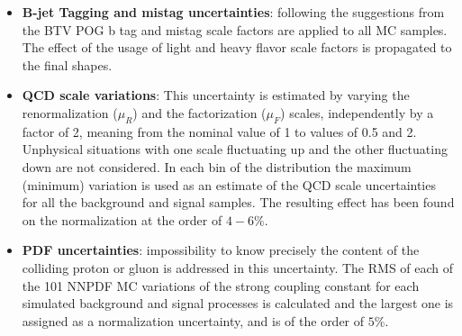 \begin{itemize}
 \item {\bf B-jet Tagging and mistag uncertainties}: following the suggestions from the BTV POG
   b tag and mistag scale factors are applied to all MC samples. The effect of the usage of 
   light and heavy flavor scale factors is propagated to the final shapes.

  

\item {\bf QCD scale variations}: This uncertainty is estimated by varying the renormalization ($\mu_{R}$) and the factorization ($\mu_{F}$) scales, independently by a factor of 2, meaning from the nominal value of 1 to values of 0.5 and 2. Unphysical situations with one scale fluctuating up and the other fluctuating down are not considered. In each bin of the distribution the maximum (minimum) variation is used as an estimate of the QCD scale uncertainties for all the background and signal samples. The resulting effect has been found on the normalization at the order of $4-6\%$.


\item {\bf PDF uncertainties}: impossibility to know precisely the
   content of the colliding proton or gluon is addressed in this
   uncertainty. The RMS of each of the 101 NNPDF MC variations of the strong coupling constant for each simulated background and signal processes is calculated and the largest one is assigned as a normalization uncertainty, and is of the order of $5\%$. 






\end{itemize}
